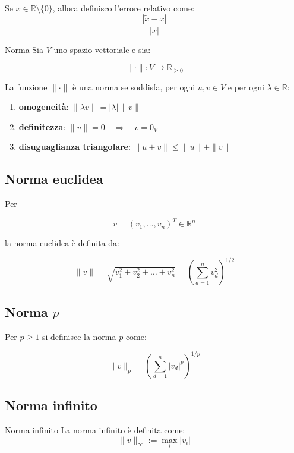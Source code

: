 \documentclass{article}
\begin{document}
Se $x\in\mathbb{R}\setminus\{0\}$, allora definisco l'\underline{errore relativo} come:$$\boxed{\frac{|\widetilde{x}-x|}{|x|}}$$

\begin{defi}{Norma}{}
    Sia $V$ uno spazio vettoriale e sia:

    $$
        \|\cdot\|:V\longrightarrow\mathbb{R}_{\ge0}
    $$

    La funzione $\|\cdot\|$ è una norma se soddisfa, per ogni $u,v\in V$ e per ogni $\lambda\in\mathbb{R}$:

    \begin{enumerate}
        \item \textbf{omogeneità}: $\|\lambda v\|=|\lambda|\,\|v\|$

        \item \textbf{definitezza}: $\|v\|=0\quad\Longrightarrow\quad v=0_V$

        \item \textbf{disuguaglianza triangolare}: $\|u+v\|\le\|u\|+\|v\|$
    \end{enumerate}
\end{defi}

\subsection{Norma euclidea}

Per

$$
    v=(v_1,\dots,v_n)^T\in\mathbb{R}^n
$$

la norma euclidea è definita da:

$$
    \boxed{
        \|v\|
        =
        \sqrt{v_1^2+v_2^2+\dots+v_n^2}
        =
        \left(
        \sum_{d=1}^{n}v_d^2
        \right)^{1/2}}
$$

\subsection{Norma $p$}

Per $p\ge1$ si definisce la norma $p$ come:

$$
    \boxed{
        \|v\|_p
        =
        \left(
        \sum_{d=1}^{n}|v_d|^p
        \right)^{1/p}
    }
$$
\subsection{Norma infinito}
\begin{defi}{Norma infinito}{}
    La norma infinito è definita come:
    $$
        \|v\|_\infty
        :=
        \max_i |v_i|
    $$
\end{defi}
\end{document}
